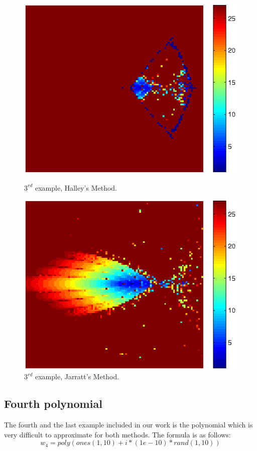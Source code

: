\documentclass{article}
\begin{document}
\begin{figure}[H]
	\begin{minipage}[b]{0.48\linewidth}
		\centering
		\includegraphics[scale=0.68]{example3halley.jpg}
		\caption{$3^{rd}$ example, Halley's Method.}
		\label{fig:figure5}
	\end{minipage}
	\hspace{0.5cm}
	\begin{minipage}[b]{0.48\linewidth}
		\centering
		\includegraphics[scale=0.68]{example3jarratt.jpg}
		\caption{$3^{rd}$ example, Jarratt's Method.}
		\label{fig:figure6}
	\end{minipage}
\end{figure}

\subsection{Fourth polynomial}
The fourth and the last example included in our work is the polynomial which is very difficult to
approximate for both methods. The formula is as follows:
\[w_4 = poly(ones(1,10) + i*(1e-10) * rand(1,10)) \]
\end{document}
